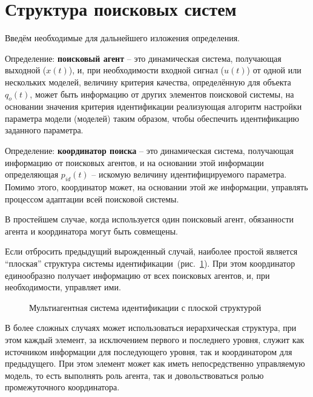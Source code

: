 






\section{Структура поисковых систем}  %


Введём необходимые для дальнейшего изложения определения.

Определение: \textbf{поисковый агент} -- это динамическая система, получающая выходной ($x(t)$),
и, при необходимости входной сигнал ($u(t)$) от одной или нескольких моделей,
величину критерия качества, определённую для объекта $q_o(t)$,
может быть информацию от других элементов поисковой системы,
на основании значения критерия идентификации
реализующая алгоритм настройки параметра модели (моделей)
таким образом, чтобы обеспечить идентификацию заданного параметра.

Определение: \textbf{координатор поиска} -- это динамическая система, получающая информацию
от поисковых агентов, и на основании этой информации определяющая
$p_{id}(t)$ -- искомую величину идентифицируемого параметра.
Помимо этого, координатор может, на основании этой же информации,
управлять процессом адаптации всей поисковой системы.

В простейшем случае, когда используется один поисковый агент,
обязанности агента и координатора могут быть совмещены.

Если отбросить предыдущий вырожденный случай,
наиболее простой является ``плоская'' структура системы идентификации~(рис.~\ref{atu:f:agents_flat}).
При этом координатор единообразно получает информацию от всех поисковых агентов,
и, при необходимости, управляет ими.

\begin{figure}[htb!]
\begin{center}

\end{center}
\caption{Мультиагентная система идентификации с плоской структурой}
\label{atu:f:agents_flat}
\end{figure}

В более сложных случаях может использоваться иерархическая структура,
при этом каждый элемент, за исключением первого и последнего
уровня, служит как источником информации для последующего
уровня, так и координатором для предыдущего. При этом элемент
может как иметь непосредственно управляемую модель,
то есть выполнять роль агента, так и довольствоваться ролью промежуточного
координатора.

